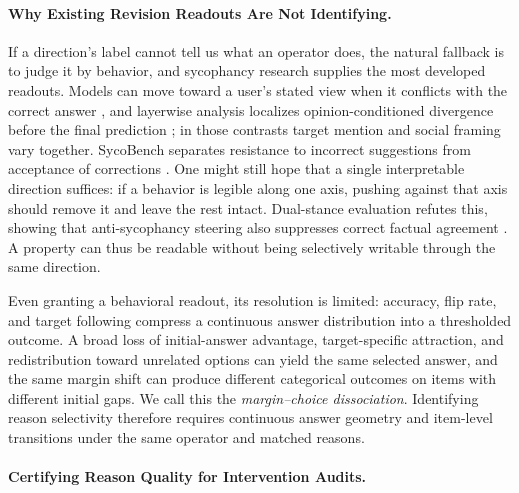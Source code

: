 \documentclass[letterpaper]{article} %
\begin{document}
\paragraph{Why Existing Revision Readouts Are Not Identifying.}

If a direction's label cannot tell us what an operator does, the natural fallback is to judge it by behavior, and sycophancy research supplies the most developed readouts. Models can move toward a user's stated view when it conflicts with the correct answer \citep{sharma2024towards}, and layerwise analysis localizes opinion-conditioned divergence before the final prediction \citep{wang2026truth}; in those contrasts target mention and social framing vary together. SycoBench separates resistance to incorrect suggestions from acceptance of corrections \citep{sinha2026sycobench}. One might still hope that a single interpretable direction suffices: if a behavior is legible along one axis, pushing against that axis should remove it and leave the rest intact. Dual-stance evaluation refutes this, showing that anti-sycophancy steering also suppresses correct factual agreement \citep{buchan2026dual}. A property can thus be readable without being selectively writable through the same direction.

Even granting a behavioral readout, its resolution is limited: accuracy, flip rate, and target following compress a continuous answer distribution into a thresholded outcome. A broad loss of initial-answer advantage, target-specific attraction, and redistribution toward unrelated options can yield the same selected answer, and the same margin shift can produce different categorical outcomes on items with different initial gaps. We call this the \emph{margin--choice dissociation}. Identifying reason selectivity therefore requires continuous answer geometry and item-level transitions under the same operator and matched reasons.

\paragraph{Certifying Reason Quality for Intervention Audits.}
\end{document}
